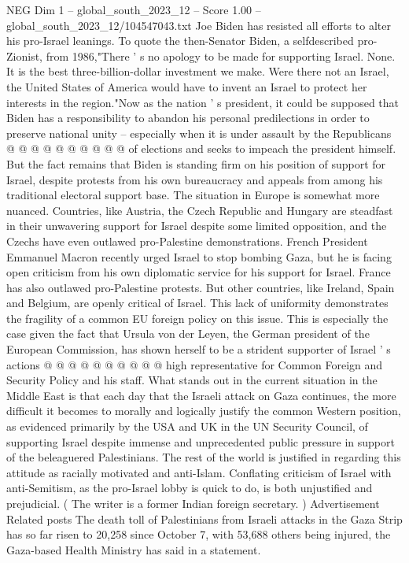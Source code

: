 \begin{textsample}{NEG Dim 1 – global\_south\_2023\_12 – Score 1.00 – global\_south\_2023\_12/104547043.txt}
Joe Biden has resisted all efforts to alter his pro-Israel leanings.
To quote the then-Senator Biden, a selfdescribed pro-Zionist, from 1986,"There ' s no apology to be made for supporting Israel.
None.
It is the best three-billion-dollar investment we make.
Were there not an Israel, the United States of America would have to invent an Israel to protect her interests in the region."Now as the nation ' s president, it could be supposed that Biden has a responsibility to abandon his personal predilections in order to preserve national unity -- especially when it is under assault by the Republicans @ @ @ @ @ @ @ @ @ @ of elections and seeks to impeach the president himself.
But the fact remains that Biden is standing firm on his position of support for Israel, despite protests from his own bureaucracy and appeals from among his traditional electoral support base.
The situation in Europe is somewhat more nuanced.
Countries, like Austria, the Czech Republic and Hungary are steadfast in their unwavering support for Israel despite some limited opposition, and the Czechs have even outlawed pro-Palestine demonstrations.
French President Emmanuel Macron recently urged Israel to stop bombing Gaza, but he is facing open criticism from his own diplomatic service for his support for Israel.
France has also outlawed pro-Palestine protests.
But other countries, like Ireland, Spain and Belgium, are openly critical of Israel.
This lack of uniformity demonstrates the fragility of a common EU foreign policy on this issue.
This is especially the case given the fact that Ursula von der Leyen, the German president of the European Commission, has shown herself to be a strident supporter of Israel ' s actions @ @ @ @ @ @ @ @ @ @ high representative for Common Foreign and Security Policy and his staff.
What stands out in the current situation in the Middle East is that each day that the Israeli attack on Gaza continues, the more difficult it becomes to morally and logically justify the common Western position, as evidenced primarily by the USA and UK in the UN Security Council, of supporting Israel despite immense and unprecedented public pressure in support of the beleaguered Palestinians.
The rest of the world is justified in regarding this attitude as racially motivated and anti-Islam.
Conflating criticism of Israel with anti-Semitism, as the pro-Israel lobby is quick to do, is both unjustified and prejudicial. ( The writer is a former Indian foreign secretary. ) Advertisement Related posts The death toll of Palestinians from Israeli attacks in the Gaza Strip has so far risen to 20,258 since October 7, with 53,688 others being injured, the Gaza-based Health Ministry has said in a statement.

\end{textsample}
